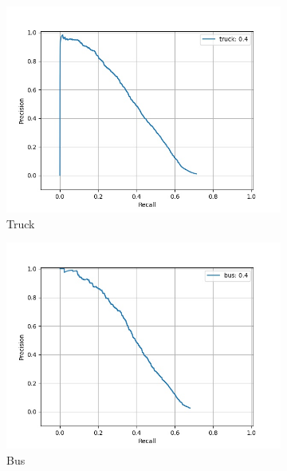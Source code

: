 \begin{figure}[H]
    	\begin{subfigure}[t]{0.325\textwidth}
    		\centering
    		\includegraphics[width=\textwidth]{images/bnn_pr/class_truck_pr.jpg}
    		\caption{Truck}
    	\end{subfigure}
    	\begin{subfigure}[t]{0.325\textwidth}
    		\centering
    		\includegraphics[width=\textwidth]{images/bnn_pr/class_bus_pr.jpg}
    		\caption{Bus}
    	\end{subfigure}
    	\begin{subfigure}[t]{0.325\textwidth}
    		\centering

\end{subfigure}
\end{figure}
